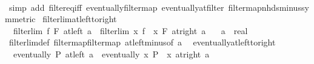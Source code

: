 \begin{isabellebody}
%
\isadelimproof
\ \ %
\endisadelimproof
%
\isatagproof
{}\isamarkupfalse%
\ {\isacharparenleft}{\kern0pt}simp\ add{\isacharcolon}{\kern0pt}\ filter{\isacharunderscore}{\kern0pt}eq{\isacharunderscore}{\kern0pt}iff\ eventually{\isacharunderscore}{\kern0pt}filtermap\ eventually{\isacharunderscore}{\kern0pt}at{\isacharunderscore}{\kern0pt}filter\ filtermap{\isacharunderscore}{\kern0pt}nhds{\isacharunderscore}{\kern0pt}minus{\isacharbrackleft}{\kern0pt}symmetric{\isacharbrackright}{\kern0pt}{\isacharparenright}{\kern0pt}%
\endisatagproof
{\isafoldproof}%
%
\isadelimproof
\isanewline
%
\endisadelimproof
\isanewline
\isanewline
{}\isamarkupfalse%
\ filterlim{\isacharunderscore}{\kern0pt}at{\isacharunderscore}{\kern0pt}left{\isacharunderscore}{\kern0pt}to{\isacharunderscore}{\kern0pt}right{\isacharcolon}{\kern0pt}\isanewline
\ \ {\isachardoublequoteopen}filterlim\ f\ F\ {\isacharparenleft}{\kern0pt}at{\isacharunderscore}{\kern0pt}left\ a{\isacharparenright}{\kern0pt}\ {\isasymlongleftrightarrow}\ filterlim\ {\isacharparenleft}{\kern0pt}{\isasymlambda}x{\isachardot}{\kern0pt}\ f\ {\isacharparenleft}{\kern0pt}{\isacharminus}{\kern0pt}\ x{\isacharparenright}{\kern0pt}{\isacharparenright}{\kern0pt}\ F\ {\isacharparenleft}{\kern0pt}at{\isacharunderscore}{\kern0pt}right\ {\isacharparenleft}{\kern0pt}{\isacharminus}{\kern0pt}a{\isacharparenright}{\kern0pt}{\isacharparenright}{\kern0pt}{\isachardoublequoteclose}\isanewline
\ \ \ a\ {\isacharcolon}{\kern0pt}{\isacharcolon}{\kern0pt}\ real\isanewline
%
\isadelimproof
\ \ %
\endisadelimproof
%
\isatagproof
{}\isamarkupfalse%
\ filterlim{\isacharunderscore}{\kern0pt}def\ filtermap{\isacharunderscore}{\kern0pt}filtermap\ at{\isacharunderscore}{\kern0pt}left{\isacharunderscore}{\kern0pt}minus{\isacharbrackleft}{\kern0pt}of\ a{\isacharbrackright}{\kern0pt}\ \isacommand{{\isachardot}{\kern0pt}{\isachardot}{\kern0pt}}\isamarkupfalse%
%
\endisatagproof
{\isafoldproof}%
%
\isadelimproof
\isanewline
%
\endisadelimproof
\isanewline
{}\isamarkupfalse%
\ eventually{\isacharunderscore}{\kern0pt}at{\isacharunderscore}{\kern0pt}left{\isacharunderscore}{\kern0pt}to{\isacharunderscore}{\kern0pt}right{\isacharcolon}{\kern0pt}\isanewline
\ \ {\isachardoublequoteopen}eventually\ P\ {\isacharparenleft}{\kern0pt}at{\isacharunderscore}{\kern0pt}left\ a{\isacharparenright}{\kern0pt}\ {\isasymlongleftrightarrow}\ eventually\ {\isacharparenleft}{\kern0pt}{\isasymlambda}x{\isachardot}{\kern0pt}\ P\ {\isacharparenleft}{\kern0pt}{\isacharminus}{\kern0pt}\ x{\isacharparenright}{\kern0pt}{\isacharparenright}{\kern0pt}\ {\isacharparenleft}{\kern0pt}at{\isacharunderscore}{\kern0pt}right\ {\isacharparenleft}{\kern0pt}{\isacharminus}{\kern0pt}a{\isacharparenright}{\kern0pt}{\isacharparenright}{\kern0pt}{\isachardoublequoteclose}\isanewline

\end{isabellebody}
